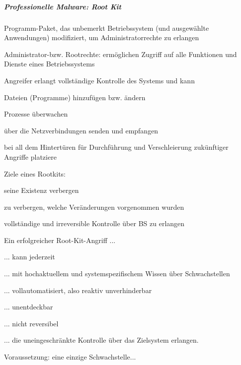 \documentclass[a4paper]{article}
\begin{document}
\begin{multicols}{3}
    \subparagraph{Professionelle Malware: Root
        Kit}

    \begin{itemize*}
        \item
        Programm-Paket, das unbemerkt Betriebssystem (und ausgewählte
        Anwendungen) modifiziert, um Administratorrechte zu erlangen
        \begin{itemize*}
            \item Administrator-bzw. Rootrechte: ermöglichen Zugriff auf alle Funktionen und Dienste eines Betriebssystems
            \item Angreifer erlangt vollständige Kontrolle des Systems und kann \begin{itemize*} \item   Dateien (Programme) hinzufügen bzw. ändern \item   Prozesse überwachen \item   über die Netzverbindungen senden und empfangen \item   bei all dem Hintertüren für Durchführung und Verschleierung   zukünftiger Angriffe platziere \end{itemize*}
            \item Ziele eines Rootkits: \begin{itemize*} \item   seine Existenz verbergen \item   zu verbergen, welche Veränderungen vorgenommen wurden \item   vollständige und irreversible Kontrolle über BS zu erlangen \end{itemize*}
        \end{itemize*}
        \item
        Ein erfolgreicher Root-Kit-Angriff ...
        \begin{itemize*}
            \item ... kann jederzeit
            \item ... mit hochaktuellem und systemspezifischem Wissen über Schwachstellen
            \item ... vollautomatisiert, also reaktiv unverhinderbar
            \item ... unentdeckbar
            \item ... nicht reversibel
            \item ... die uneingeschränkte Kontrolle über das Zielsystem erlangen.
        \end{itemize*}
        \item
        Voraussetzung: eine einzige Schwachstelle...
    \end{itemize*}



\end{multicols}
\end{document}
